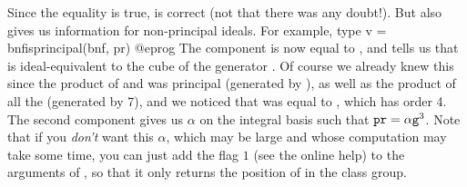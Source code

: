 Since the equality is true,  is correct (not that there was any
doubt!). But  also gives us information for non-principal
ideals. For example, type
\bprog
  v = bnfisprincipal(bnf, pr)
@eprog\noindent
The component  is now equal to \kbd{[3]}, and tells us that 
is ideal-equivalent to the cube of the generator . Of course we
already knew this since the product of  and  was
principal (generated by ), as well as the product of all the
 (generated by 7), and we noticed that  was equal
to , which has order 4. The second component  gives us
$\alpha$ on the integral basis such that ${\tt pr}=\alpha {\tt g}^3$. Note
that if you \emph{don't} want this $\alpha$, which may be large and whose
computation may take some time, you can just add the flag $1$ (see the online
help) to the arguments of , so that it only returns the
position of  in the class group. \smallskip



